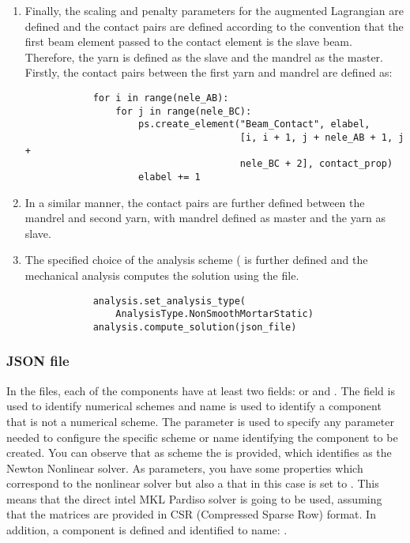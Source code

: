 \begin{enumerate}
    \item Finally, the scaling and penalty parameters for the augmented Lagrangian are defined and the contact pairs are defined according to the convention that the first beam element passed to the contact element is the slave beam. Therefore, the yarn is defined as the slave and the mandrel as the master. Firstly, the contact pairs between the first yarn  and mandrel  are defined as:
        \pythonstyle
        \begin{tcolorbox}\begin{lstlisting}
            for i in range(nele_AB):
                for j in range(nele_BC):
                    ps.create_element("Beam_Contact", elabel,
                                      [i, i + 1, j + nele_AB + 1, j +
                                      nele_BC + 2], contact_prop)
                    elabel += 1
        \end{lstlisting}\end{tcolorbox}
    \item In a similar manner, the contact pairs are further defined between the mandrel and second yarn, with mandrel defined as master and the yarn as slave.
    \item The specified choice of the analysis scheme ( is further defined and the mechanical analysis computes the solution using the  file.
        \pythonstyle
        \begin{tcolorbox}\begin{lstlisting}
            analysis.set_analysis_type(
                AnalysisType.NonSmoothMortarStatic)
            analysis.compute_solution(json_file)
        \end{lstlisting}\end{tcolorbox}    
\end{enumerate}

\subsubsection{JSON file}
In the  files, each of the components have at least two fields:  or  and . The field  is used to identify numerical schemes and name is used to identify a component that is not a numerical scheme. The  parameter is used to specify any parameter needed to configure the specific scheme or name identifying the component to be created. You can observe that as scheme the  is provided, which identifies as the Newton Nonlinear solver. As parameters, you have some properties which correspond to the nonlinear solver but also a  that in this case is set to . This means that the direct intel MKL Pardiso solver is going to be used, assuming that the matrices are provided in CSR (Compressed Sparse Row) format. In addition, a component  is defined and identified to name: .

